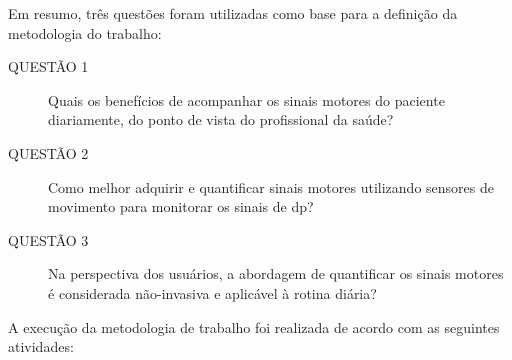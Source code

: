 Em resumo, três questões foram utilizadas como base para a definição da metodologia do trabalho:
	\begin{description}
	\item[QUESTÃO 1] Quais os benefícios de acompanhar os sinais motores do paciente diariamente, do ponto de vista do profissional da saúde?
	\item[QUESTÃO 2] Como melhor adquirir e quantificar sinais motores utilizando sensores de movimento para monitorar os sinais de \ac{dp}?
	\item[QUESTÃO 3] Na perspectiva dos usuários, a abordagem de quantificar os sinais motores é considerada não-invasiva e aplicável à rotina diária?
	\end{description}

A execução da metodologia de trabalho foi realizada de acordo com as seguintes atividades:
